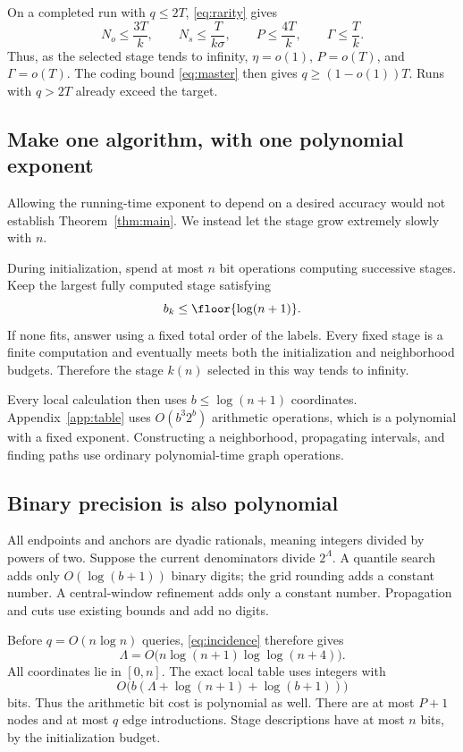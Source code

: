 On a completed run with \(q\le2T\), \eqref{eq:rarity} gives
\[
N_o\le\frac{3T}{k},\qquad
N_s\le\frac{T}{k\sigma},\qquad
P\le\frac{4T}{k},\qquad\Gamma\le\frac Tk.
\]
Thus, as the selected stage tends to infinity, \(\eta=o(1)\), \(P=o(T)\), and \(\Gamma=o(T)\). The coding bound \eqref{eq:master} then gives \(q\ge(1-o(1))T\). Runs with \(q>2T\) already exceed the target.

\subsection{Make one algorithm, with one polynomial exponent}

Allowing the running-time exponent to depend on a desired accuracy would not establish Theorem~\ref{thm:main}. We instead let the stage grow extremely slowly with \(n\).

During initialization, spend at most \(n\) bit operations computing successive stages. Keep the largest fully computed stage satisfying
\[
b_k\le\floor{\log(n+1)}.
\]
If none fits, answer using a fixed total order of the labels. Every fixed stage is a finite computation and eventually meets both the initialization and neighborhood budgets. Therefore the stage \(k(n)\) selected in this way tends to infinity.

Every local calculation then uses \(b\le\log(n+1)\) coordinates. Appendix~\ref{app:table} uses \(O(b^3 2^b)\) arithmetic operations, which is a polynomial with a fixed exponent. Constructing a neighborhood, propagating intervals, and finding paths use ordinary polynomial-time graph operations.

\subsection{Binary precision is also polynomial}

All endpoints and anchors are dyadic rationals, meaning integers divided by powers of two. Suppose the current denominators divide \(2^\Lambda\). A quantile search adds only \(O(\log(b+1))\) binary digits; the grid rounding adds a constant number. A central-window refinement adds only a constant number. Propagation and cuts use existing bounds and add no digits.

Before \(q=O(n\log n)\) queries, \eqref{eq:incidence} therefore gives
\[
\Lambda=O\bigl(n\log(n+1)\log\log(n+4)\bigr).
\]
All coordinates lie in \([0,n]\). The exact local table uses integers with
\[
O\bigl(b(\Lambda+\log(n+1)+\log(b+1))\bigr)
\]
bits. Thus the arithmetic bit cost is polynomial as well. There are at most \(P+1\) nodes and at most \(q\) edge introductions. Stage descriptions have at most \(n\) bits, by the initialization budget.


